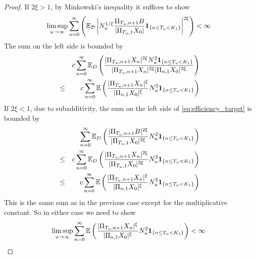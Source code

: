 \begin{proof}
  If $2 \xi > 1$, by Minkowski's inequality it suffices to show
  \begin{eqnarray*}
    \limsup_{u \to \infty}
    \sum_{n=0}^{\infty}
    \left(
      \mathbb{E}_{\mathcal D} \left|
        N_u^{1/\xi}
        \frac{
          \Pi_{T_u, n+1} B 
        }{
          |\Pi_{T_u, 1} X_0|
        }
        \mathbf{1}_{\{n \leq T_u < K_1\}}
      \right|^{2 \xi}
    \right)
    < \infty
  \end{eqnarray*}
  The sum on the left side is bounded by
  \begin{eqnarray*}
    && c \sum_{n=0}^\infty
    \mathbb{E}_D
    \left(
      {
        |\Pi_{T_u, n+1} X_n|^{2\xi}
        N_u^2
        \mathbf{1}_{\{n \leq T_u < K_1\}}
        \over
        |\Pi_{T_u, n+1} X_n|^{2\xi}
        |\Pi_{n,1} X_0|^{2\xi}
      }
    \right)\\
    &\leq&
    c \sum_{n=0}^\infty
    \mathbb{E}
    \left(
      {
        |\Pi_{T_u, n+1} X_n|^\xi
        \over
        |\Pi_{n,1} X_0|^{\xi}
      }
      N_u^2
      \mathbf{1}_{\{n \leq T_u < K_1\}}
    \right)
  \end{eqnarray*}
  If $2\xi < 1$, due to subadditivity, the sum on the left side of
  \eqref{eq:efficiency_target} is bounded by
  \begin{eqnarray*}
    && \sum_{n=0}^\infty
    \mathbb{E}_D \left(
      {
        | \Pi_{T_u, n+1} B |^{2\xi}
        \over
        | \Pi_{T_u, 1} X_0 |^{2\xi}
      }
      N_u^2
      \mathbf{1}_{\{n \leq T_u < K_1\}}
    \right) \\
    &\leq&
    c \sum_{n=0}^\infty
    \mathbb{E}_D \left(
      {
        | \Pi_{T_u, n+1} X_n |^{2\xi}
        \over
        | \Pi_{T_u, 1} X_0 |^{2\xi}
      }
      N_u^2
      \mathbf{1}_{\{n \leq T_u < K_1\}}
    \right) \\
    &\leq&
    c \sum_{n=0}^\infty
    \mathbb{E} \left(
      {
        | \Pi_{T_u, n+1} X_n |^{\xi}
        \over
        | \Pi_{n,1} X_0 |^{\xi}
      }
      N_u^2
      \mathbf{1}_{\{n \leq T_u < K_1\}}
    \right)
  \end{eqnarray*}
  This is the same sum as in the previous case except for the
  multiplicative constant. So in either case we need to show
  \begin{equation}
    \label{eq:rhjd}
    \limsup_{u \to \infty}
    \sum_{n=0}^\infty
    \mathbb{E} \left(
      {
        | \Pi_{T_u, n+1} X_n |^{\xi}
        \over
        | \Pi_{n,1} X_0 |^{\xi}
      }
      N_u^2
      \mathbf{1}_{\{n \leq T_u < K_1\}}
    \right) < \infty
  \end{equation}
  

\end{proof}

